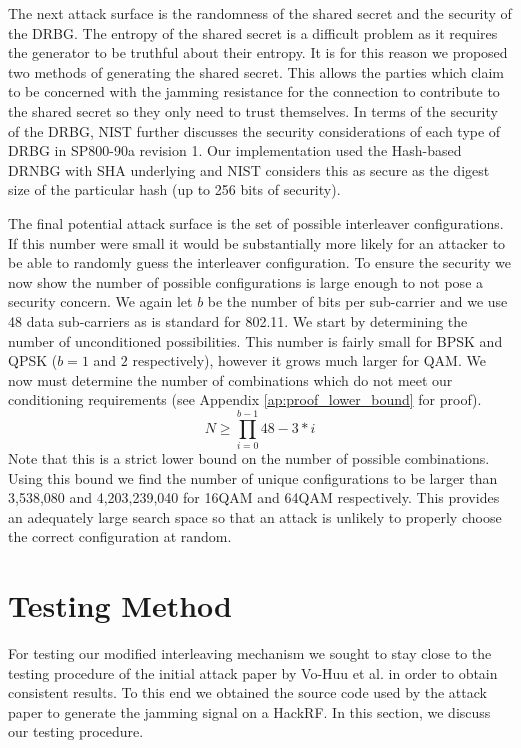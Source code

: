 \documentclass[sigconf]{acmart}
\begin{document}
The next attack surface is the randomness of the shared secret and the security of the DRBG. The entropy of the shared secret is a difficult problem as it requires the generator to be truthful about their entropy. It is for this reason we proposed two methods of generating the shared secret. This allows the parties which claim to be concerned with the jamming resistance for the connection to contribute to the shared secret so they only need to trust themselves. In terms of the security of the DRBG, NIST further discusses the security considerations of each type of DRBG in SP800-90a revision 1\cite{barker2015nist90a}. Our implementation used the Hash-based DRNBG with SHA underlying and NIST considers this as secure as the digest size of the particular hash (up to 256 bits of security). 

The final potential attack surface is the set of possible interleaver configurations. If this number were small it would be substantially more likely for an attacker to be able to randomly guess the interleaver configuration. To ensure the security we now show the number of possible configurations is large enough to not pose a security concern. We again let $b$ be the number of bits per sub-carrier and we use 48 data sub-carriers as is standard for 802.11. We start by determining the number of unconditioned possibilities. This number is fairly small for BPSK and QPSK ($b= 1$ and $2$ respectively), however it grows much larger for QAM. We now must determine the number of combinations which do not meet our conditioning requirements (see Appendix \ref{ap:proof_lower_bound} for proof). 
$$N \geq \prod_{i=0}^{b-1} 48 - 3*i$$
Note that this is a strict lower bound on the number of possible combinations. Using this bound we find the number of unique configurations to be larger than 3,538,080 and 4,203,239,040 for 16QAM and 64QAM respectively.  This provides an adequately large search space so that an attack is unlikely to properly choose the correct configuration at random.

\section{Testing Method}
\label{sec:testing}

For testing our modified interleaving mechanism we sought to stay close to the testing procedure of the initial attack paper by Vo-Huu et al. in order to obtain consistent results\cite{vo2016interleaving}. To this end we obtained the source code used by the attack paper to generate the jamming signal on a HackRF. In this section, we discuss our testing procedure.
\end{document}

